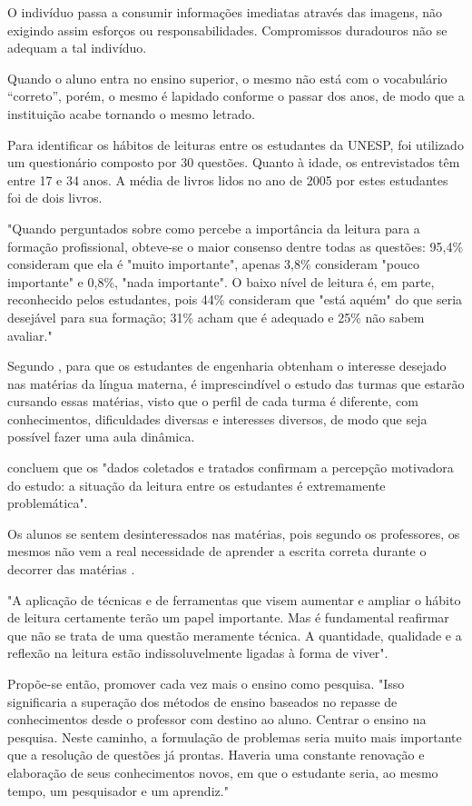 \documentclass[
	article,			%
	11pt,				%
	oneside,			%
	a4paper,			%
	english,			%
	brazil,				%
	sumario=tradicional
	]{abntex2}
\begin{document}
O indivíduo passa a consumir informações imediatas através das imagens, não exigindo assim esforços ou responsabilidades. Compromissos duradouros não se adequam a tal indivíduo.

Quando o aluno entra no ensino superior, o mesmo não está com o vocabulário “correto”, porém, o mesmo é lapidado conforme o passar dos anos, de modo que a instituição acabe tornando o mesmo letrado. \cite{FichamentoBili}

Para identificar os hábitos de leituras entre os estudantes da UNESP, foi utilizado um questionário composto por 30 questões.
Quanto à idade, os entrevistados têm entre 17 e 34 anos. A média de livros lidos no ano de 2005 por estes estudantes foi de dois livros. 

"Quando perguntados sobre como percebe a importância da leitura para a formação profissional, obteve-se o maior consenso dentre todas as questões: 95,4\% consideram que ela é "muito importante", apenas 3,8\% consideram "pouco importante" e 0,8\%, "nada importante". O baixo nível de leitura é, em parte, reconhecido pelos estudantes, pois 44\% consideram que "está aquém" do que seria desejável para sua formação; 31\% acham que é adequado e 25\% não sabem avaliar." \cite[p.9.141]{habitosleit}

Segundo , para que os estudantes de engenharia obtenham o interesse desejado nas matérias da língua materna, é imprescindível o estudo das turmas que estarão cursando essas matérias, visto que o perfil de cada turma é diferente, com conhecimentos, dificuldades diversas e interesses diversos, de modo que seja possível fazer uma aula dinâmica.

 concluem que os "dados coletados e tratados confirmam a percepção motivadora do estudo: a situação da leitura entre os estudantes é extremamente problemática".

Os alunos se sentem desinteressados nas matérias, pois segundo os professores, os mesmos não vem a real necessidade de aprender a escrita correta durante o decorrer das matérias \cite{FichamentoBili}.

"A aplicação de técnicas e de ferramentas que visem aumentar e ampliar o hábito de leitura certamente terão um papel importante. Mas é fundamental reafirmar que não se trata de uma questão meramente técnica. A quantidade, qualidade e a reflexão na leitura estão indissoluvelmente ligadas à forma de viver". \cite[p.9.143]{habitosleit}

Propõe-se então, promover cada vez mais o ensino como pesquisa. "Isso significaria a superação dos métodos de ensino baseados no repasse de conhecimentos desde o professor com destino ao aluno. Centrar o ensino na pesquisa. Neste caminho, a formulação de problemas seria muito mais importante que a resolução de questões já prontas. Haveria uma constante renovação e elaboração de seus conhecimentos novos, em que o estudante seria, ao mesmo tempo, um pesquisador e um aprendiz." \cite[p.9.143]{habitosleit}
\end{document}
